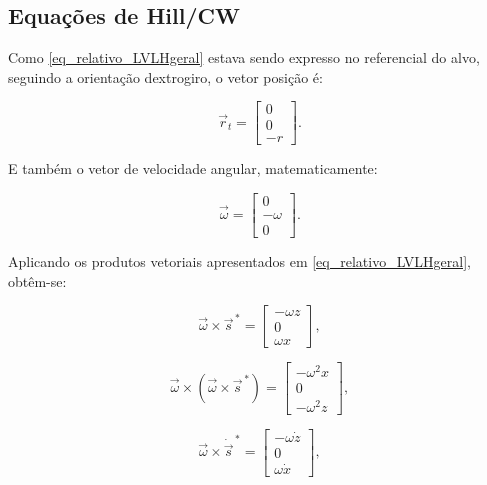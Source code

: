 \subsection{Equações de Hill/CW}
\label{sec_hillcw}

Como \eqref{eq_relativo_LVLHgeral} estava sendo expresso no referencial do alvo, seguindo a orientação dextrogiro, o vetor posição é:

\begin{equation}
\label{eq_posicao_LVLH_target}
\vec r_t
=
\begin{bmatrix}
0 \\
0 \\
-r
\end{bmatrix}.
\end{equation}

E também o vetor de velocidade angular, matematicamente:

\begin{equation}
\label{eq_velocidadeAngular_LVLH_target}
\vec\omega=
\begin{bmatrix}
0 \\
-\omega \\
0
\end{bmatrix}.
\end{equation}

Aplicando os produtos vetoriais apresentados em \eqref{eq_relativo_LVLHgeral}, obtêm-se:

\begin{equation}
\label{eq_velAngular_cross_s}
\vec\omega \times \vec s^{\,*} =
\begin{bmatrix}
-\omega z \\
0         \\
\omega x
\end{bmatrix},
\end{equation}

\begin{equation}
\label{eq_velAngular_cross_cross_s}
\vec\omega \times (\vec\omega \times \vec s^{\,*} )
=
\begin{bmatrix}
-\omega^2 x \\
0           \\
-\omega^2 z 
\end{bmatrix},
\end{equation}

\begin{equation}
\label{eq_omega_cross_dsdt}
\vec\omega \times \dot{\vec s}^{\,*} 
=
\begin{bmatrix}
-\omega \dot z \\
0 \\
\omega \dot x
\end{bmatrix},
\end{equation}

